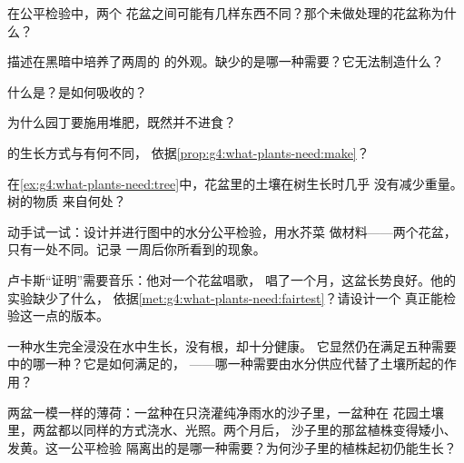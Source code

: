 \begin{exercise}[$\star$]\label{exo:g4:what-plants-need:2}
在公平检验中，两个
花盆之间可能有几样东西不同？那个未做处理的花盆称为什么？
\end{exercise}

\begin{exercise}[$\star$]\label{exo:g4:what-plants-need:3}
描述在黑暗中培养了两周的
的外观。缺少的是哪一种需要？它无法制造什么？
\end{exercise}

\begin{exercise}[$\star$]\label{exo:g4:what-plants-need:4}
什么是？是如何吸收的？
\end{exercise}

\begin{exercise}[$\star$]\label{exo:g4:what-plants-need:5}
为什么园丁要施用堆肥，既然并不进食？
\end{exercise}

\begin{exercise}[$\star$]\label{exo:g4:what-plants-need:6}
的生长方式与有何不同，
依据\cref{prop:g4:what-plants-need:make}？
\end{exercise}

\begin{exercise}[$\star$]\label{exo:g4:what-plants-need:7}
在\cref{ex:g4:what-plants-need:tree}中，花盆里的土壤在树生长时几乎
没有减少重量。树的物质
来自何处？
\end{exercise}

\begin{exercise}[$\star$]\label{exo:g4:what-plants-need:8}
动手试一试：设计并进行图中的水分公平检验，用水芥菜
做材料——两个花盆，只有一处不同。记录
一周后你所看到的现象。
\end{exercise}

\begin{exercise}[$\star\star$]\label{exo:g4:what-plants-need:9}
卢卡斯“证明”需要音乐：他对一个花盆唱歌，
唱了一个月，这盆长势良好。他的实验缺少了什么，
依据\cref{met:g4:what-plants-need:fairtest}？请设计一个
真正能检验这一点的版本。
\end{exercise}

\begin{exercise}[$\star\star$]\label{exo:g4:what-plants-need:10}
一种水生完全浸没在水中生长，没有根，却十分健康。
它显然仍在满足五种需要中的哪一种？它是如何满足的，
——哪一种需要由水分供应代替了土壤所起的作用？
\end{exercise}

\begin{exercise}[$\star\star\star$]\label{exo:g4:what-plants-need:11}
两盆一模一样的薄荷：一盆种在只浇灌纯净雨水的沙子里，一盆种在
花园土壤里，两盆都以同样的方式浇水、光照。两个月后，
沙子里的那盆植株变得矮小、发黄。这一公平检验
隔离出的是哪一种需要？为何沙子里的植株起初仍能生长？
\end{exercise}
